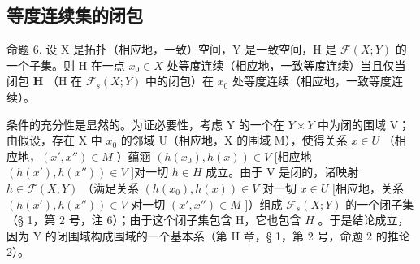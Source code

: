 \subsection{等度连续集的闭包}

命题 6. 设 X 是拓扑（相应地，一致）空间，Y 是一致空间，H 是 \(\mathcal{F}(X;Y)\) 的一个子集。则 H 在一点 \(x_0 \in X\) 处等度连续（相应地，一致等度连续）当且仅当闭包 \(\overline{\mathbf{H}}\) （H 在 \(\mathcal{F}_s(X;Y)\) 中的闭包）在 \(x_0\) 处等度连续（相应地，一致等度连续）。

条件的充分性是显然的。为证必要性，考虑 Y 的一个在 \(Y \times Y\) 中为闭的围域 V；由假设，存在 X 中 \(x_{0}\) 的邻域 U（相应地，X 的围域 M），使得关系 \(x \in U\) （相应地，\((x', x'') \in M\) ）蕴涵 \((h(x_{0}), h(x)) \in V\) {[}相应地 \((h(x'), h(x'')) \in V\) {]}对一切 \(h \in H\) 成立。由于 V 是闭的，诸映射 \(h \in \mathcal{F}(X; Y)\) （满足关系 \((h(x_{0}), h(x)) \in V\) 对一切 \(x \in U\) {[}相应地，关系 \((h(x'), h(x'')) \in V\) 对一切 \((x', x'') \in M\) {]}）组成 \(\mathcal{F}_{s}(X; Y)\) 的一个闭子集（§ 1，第 2 号，注 6）；由于这个闭子集包含 H，它也包含 \(\overline{H}\) 。于是结论成立，因为 Y 的闭围域构成围域的一个基本系（第 II 章，§ 1，第 2 号，命题 2 的推论 2）。

